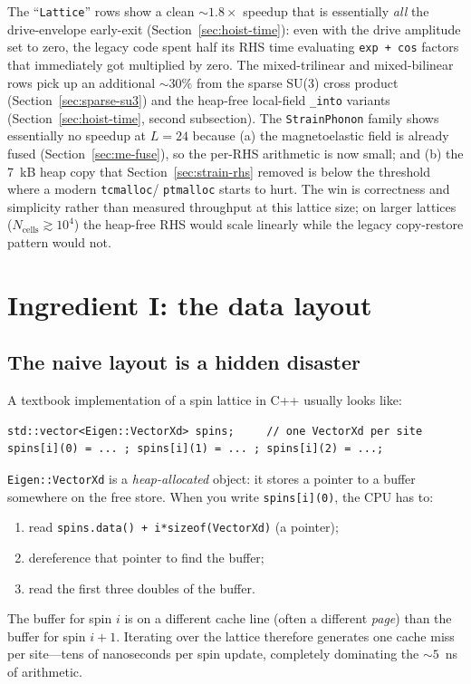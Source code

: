\documentclass[11pt,letterpaper]{article}
\begin{document}
The ``\texttt{Lattice}'' rows show a clean $\sim 1.8\times$ speedup
that is essentially \emph{all} the drive-envelope early-exit
(Section~\ref{sec:hoist-time}): even with the drive amplitude set to
zero, the legacy code spent half its RHS time evaluating
\texttt{exp + cos} factors that immediately got multiplied by zero.
The mixed-trilinear and mixed-bilinear rows pick up an additional
$\sim 30\%$ from the sparse SU(3) cross product
(Section~\ref{sec:sparse-su3}) and the heap-free local-field
\texttt{\_into} variants (Section~\ref{sec:hoist-time}, second
subsection).  The \texttt{StrainPhonon} family shows essentially no
speedup at $L = 24$ because (a) the magnetoelastic field is already
fused (Section~\ref{sec:me-fuse}), so the per-RHS arithmetic is now
small; and (b) the 7~kB heap copy that Section~\ref{sec:strain-rhs}
removed is below the threshold where a modern \texttt{tcmalloc}/
\texttt{ptmalloc} starts to hurt.  The win is correctness and
simplicity rather than measured throughput at this lattice size; on
larger lattices ($N_{\text{cells}} \gtrsim 10^{4}$) the heap-free
RHS would scale linearly while the legacy copy-restore pattern would
not.

\section{Ingredient I: the data layout}

\subsection{The naive layout is a hidden disaster}
A textbook implementation of a spin lattice in C++ usually looks like:
\begin{lstlisting}
std::vector<Eigen::VectorXd> spins;     // one VectorXd per site
spins[i](0) = ... ; spins[i](1) = ... ; spins[i](2) = ...;
\end{lstlisting}
\texttt{Eigen::VectorXd} is a \emph{heap-allocated} object: it stores a
pointer to a buffer somewhere on the free store.  When you write
\texttt{spins[i](0)}, the CPU has to:
\begin{enumerate}[noitemsep]
  \item read \texttt{spins.data() + i*sizeof(VectorXd)} (a pointer);
  \item dereference that pointer to find the buffer;
  \item read the first three doubles of the buffer.
\end{enumerate}
The buffer for spin $i$ is on a different cache line (often a different
\emph{page}) than the buffer for spin $i{+}1$.  Iterating over the
lattice therefore generates one cache miss per site---tens of nanoseconds
per spin update, completely dominating the $\sim 5$~ns of arithmetic.
\end{document}
